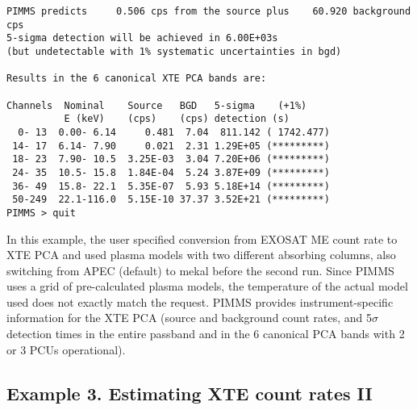 \begin{verbatim}
PIMMS predicts     0.506 cps from the source plus    60.920 background cps
5-sigma detection will be achieved in 6.00E+03s
(but undetectable with 1% systematic uncertainties in bgd)

Results in the 6 canonical XTE PCA bands are:

Channels  Nominal    Source   BGD   5-sigma    (+1%)
          E (keV)    (cps)    (cps) detection (s)
  0- 13  0.00- 6.14     0.481  7.04  811.142 ( 1742.477)
 14- 17  6.14- 7.90     0.021  2.31 1.29E+05 (*********)
 18- 23  7.90- 10.5  3.25E-03  3.04 7.20E+06 (*********)
 24- 35  10.5- 15.8  1.84E-04  5.24 3.87E+09 (*********)
 36- 49  15.8- 22.1  5.35E-07  5.93 5.18E+14 (*********)
 50-249  22.1-116.0  5.15E-10 37.37 3.52E+21 (*********)
PIMMS > quit
\end{verbatim}

In this example, the user specified conversion from EXOSAT ME count
rate to XTE PCA and used plasma models with two different absorbing
columns, also switching from APEC (default) to mekal before the second
run.  Since PIMMS uses a grid of pre-calculated plasma models, the temperature
of the actual model used does not exactly match the request.
PIMMS provides instrument-specific information for the
XTE PCA (source and background count rates, and 5$\sigma$ detection times
in the entire passband and in the 6 canonical PCA bands with 2 or 3 PCUs
operational).

\subsection*{Example 3. Estimating XTE count rates II}

